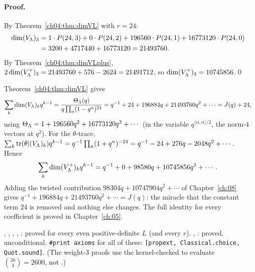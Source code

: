 \paragraph{Proof.} By Theorem~\ref{ch04:thm:dimVL} with $r=24$:
\begin{align*}
  \dim(V_{\Lambda})_3&=1\cdot P(24,3)+0\cdot P(24,2)+196560\cdot P(24,1)+16773120\cdot P(24,0)\\
  &=3200+4717440+16773120=21493760 .
\end{align*}
By Theorem~\ref{ch04:thm:dimVLplus}, $2\dim(V_{\Lambda}^+)_3=21493760+576-2624=21491712$, so
$\dim(V_{\Lambda}^+)_3=10745856$.\qed

\begin{example}\label{ch04:ex:char}
Theorem~\ref{ch04:thm:dimVL} gives
\begin{equation*}
  \sum_k\dim(V_{\Lambda})_kq^{k-1}=\frac{\Theta_{\Lambda}(q)}{q\prod_n(1-q^n)^{24}}
  =q^{-1}+24+196884q+21493760q^2+\cdots=J(q)+24,
\end{equation*}
using $\Theta_{\Lambda}=1+196560q^2+16773120q^3+\cdots$ (in the variable $q^{\langle\alpha,\alpha\rangle/2}$,
the norm-$4$ vectors at $q^2$). For the $\theta$-trace, $\sum_k\operatorname{tr}(\theta|(V_{\Lambda})_k)q^{k-1}
=q^{-1}\prod_n(1+q^n)^{-24}=q^{-1}-24+276q-2048q^2+\cdots$. Hence
\begin{equation*}
  \sum_k\dim(V_{\Lambda}^+)_kq^{k-1}=q^{-1}+0+98580q+10745856q^2+\cdots .
\end{equation*}
Adding the twisted contribution $98304q+10747904q^2+\cdots$ of Chapter~\ref{ch:08} gives
$q^{-1}+196884q+21493760q^2+\cdots=J(q)$: the miracle that the constant term $24$ is removed and
nothing else changes. The full identity for every coefficient is proved in Chapter~\ref{ch:05}.
\end{example}

\begin{status}
, ,
, ,
: proved for every even positive-definite $L$ (and every $r$).
, : proved,
unconditional. \texttt{\#print axioms} for all of these: \texttt{[propext, Classical.choice,
Quot.sound]}. (The weight-$3$ proofs use the kernel-checked  to evaluate
$\binom{26}{3}=2600$, not .)
\end{status}

